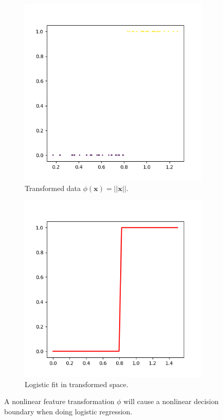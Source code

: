 \documentclass{article}
\theoremstyle{definition}
\theoremstyle{remark}
\theoremstyle{definition}
\begin{document}
\begin{figure}[hbt!]
    \centering
    \begin{subfigure}[b]{0.35\textwidth}
    \centering
        \includegraphics[width=\textwidth]{Images/logistic/trans_data.png}
        \caption{Transformed data $\phi(\mathbf{x}) = ||\mathbf{x}||$. }
        \label{fig:transformed_points}
    \end{subfigure}
    \begin{subfigure}[b]{0.35\textwidth}
    \centering
        \includegraphics[width=\textwidth]{Images/logistic/trans_fit.png}
        \caption{Logistic fit in transformed space. }
        \label{fig:transformed_trained}
    \end{subfigure}
    \caption{A nonlinear feature transformation $\phi$ will cause a nonlinear decision boundary when doing logistic regression. }
    \label{fig:logistic_transformed}
\end{figure}
\end{document}
